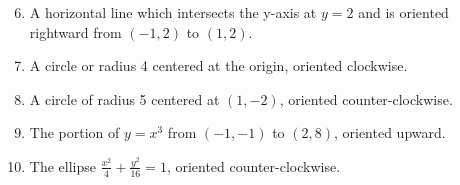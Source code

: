 \documentclass[12pt]{article}
\newif\ifans
\begin{document}
\begin{enumerate}
\setcounter{enumi}{5}

\item A horizontal line which intersects the y-axis at $y=2$ and is oriented rightward from $(-1,2)$ to $(1,2)$. 

\ifans{\fbox{$\left\{\begin{array}{l}
x=t\\
y=2\\
-1\leq t\leq 1\end{array}\right.$}} \fi

\item A circle or radius 4 centered at the origin, oriented clockwise.  

\ifans{\fbox{$\left\{\begin{array}{l}
x=4\sin{t}\\
y=4\cos{t}\\
0\leq t\leq 2\pi\end{array}\right.$}} \fi

\item A circle of radius 5 centered at $(1,-2)$, oriented counter-clockwise. 

\ifans{\fbox{$\left\{\begin{array}{l}
x=5\cos{t}-1\\
y=5\sin{t}+2\\
0\leq t\leq 2\pi \end{array}\right.$}} \fi

\item The portion of $y=x^3$ from $(-1,-1)$ to $(2,8)$, oriented upward. 

\ifans{\fbox{$\left\{\begin{array}{l}
x=t\\
y=t^3\\
-1\leq t\leq 2\end{array}\right.$}} \fi

\item The ellipse $\frac{x^2}{4}+\frac{y^2}{16}=1$, oriented counter-clockwise. 

\ifans{\fbox{$\left\{\begin{array}{l}
x=2\cos{t}\\
y=4\sin{t}\\
0\leq t\leq 2\pi\end{array}\right.$}} \fi

\end{enumerate}

\end{document}
